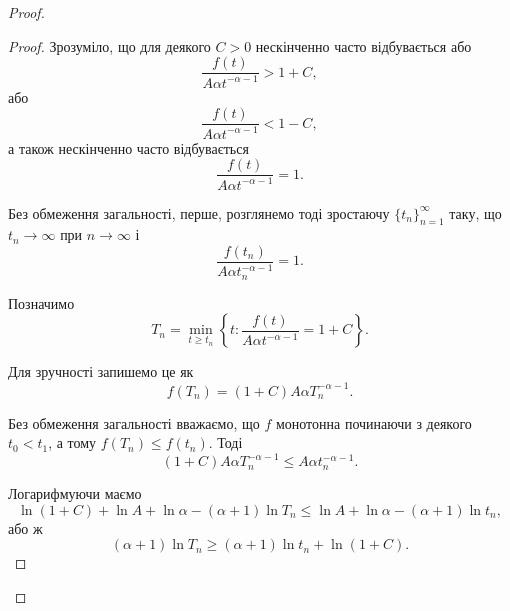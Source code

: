 \begin{proof}
\begin{proof}
        Зрозуміло, що для деякого $C > 0$ нескінченно часто відбувається або
        \begin{equation}
            \frac{f(t)}{A \alpha t^{-\alpha - 1}} > 1 + C,
        \end{equation}
        або
        \begin{equation}
            \frac{f(t)}{A \alpha t^{-\alpha - 1}} < 1 - C,
        \end{equation}
        а також нескінченно часто відбувається
        \begin{equation}
            \frac{f(t)}{A \alpha t^{-\alpha - 1}} = 1.
        \end{equation}
        
        Без обмеження загальності, перше, розглянемо тоді зростаючу $\{t_n\}_{n = 1}^\infty$ таку, що $t_n \to \infty$ при $n \to \infty$ і 
        \begin{equation}
            \frac{f(t_n)}{A \alpha t_n^{-\alpha - 1}} = 1.
        \end{equation}
        
        Позначимо
        \begin{equation}
            T_n = \min_{t \ge t_n} \left\{t: \frac{f(t)}{A \alpha t^{-\alpha - 1}} = 1 + C \right\}.
        \end{equation}
        
        Для зручності запишемо це як 
        \begin{equation}
            f(T_n) = (1 + C) A \alpha T_n^{-\alpha - 1}.
        \end{equation}
        
        Без обмеження загальності вважаємо, що $f$ монотонна починаючи з деякого $t_0 < t_1$, а тому $f(T_n) \le f(t_n)$. Тоді
        \begin{equation}
            (1 + C) A \alpha T_n^{-\alpha - 1} \le A \alpha t_n^{-\alpha - 1}.
        \end{equation}
        
        Логарифмуючи маємо
        \begin{equation}
            \ln (1 + C) + \ln A + \ln \alpha - (\alpha + 1) \ln T_n \le \ln A + \ln \alpha - (\alpha + 1) \ln t_n,
        \end{equation}
        або ж
        \begin{equation}
            (\alpha + 1) \ln T_n \ge (\alpha + 1) \ln t_n + \ln (1 + C).
        \end{equation}
        

\end{proof}
\end{proof}
